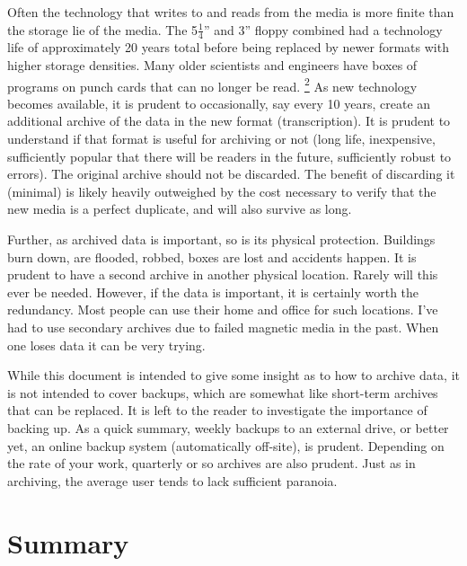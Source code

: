 \documentclass[a4paper]{article}
\providecommand*{\DUfootnotemark}[3]{%
  \raisebox{1em}{\hypertarget{#1}{}}%
  \hyperlink{#2}{\textsuperscript{#3}}%
}
\begin{document}
Often the technology that writes to and reads from the media is more
finite than the storage lie of the media. The 5$\frac{1}{4}$”
and 3” floppy combined had a technology life of approximately 20 years
total before being replaced by newer formats with higher storage
densities. Many older scientists and engineers have boxes of programs on
punch cards that can no longer be read.\DUfootnotemark{id16}{id19}{2} As new technology becomes
available, it is prudent to occasionally, say every 10 years, create an
additional archive of the data in the new format (transcription). It is
prudent to understand if that format is useful for archiving or not
(long life, inexpensive, sufficiently popular that there will be readers
in the future, sufficiently robust to errors). The original archive
should not be discarded. The benefit of discarding it (minimal) is
likely heavily outweighed by the cost necessary to verify that the new
media is a perfect duplicate, and will also survive as long.

Further, as archived data is important, so is its physical protection.
Buildings burn down, are flooded, robbed, boxes are lost and accidents
happen. It is prudent to have a second archive in another physical
location. Rarely will this ever be needed. However, if the data is
important, it is certainly worth the redundancy. Most people can use
their home and office for such locations. I've had to use secondary
archives due to failed magnetic media in the past. When one loses data
it can be very trying.

While this document is intended to give some insight as to how to
archive data, it is not intended to cover backups, which are somewhat
like short-term archives that can be replaced. It is left to the reader
to investigate the importance of backing up. As a quick summary, weekly
backups to an external drive, or better yet, an online backup system
(automatically off-site), is prudent. Depending on the rate of your
work, quarterly or so archives are also prudent. Just as in archiving,
the average user tends to lack sufficient paranoia.


\section{Summary%
  \label{summary}%
}
\end{document}
